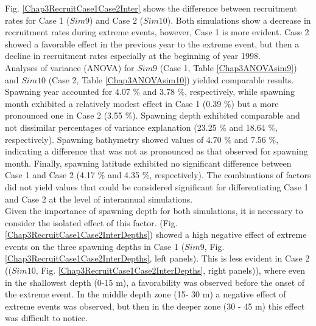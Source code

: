 Fig. \ref{Chap3RecruitCase1Case2Inter} shows the difference between recruitment rates for Case 1 ($Sim 9$) and Case 2 ($Sim 10$). Both simulations show a decrease in recruitment rates during extreme events, however, Case 1 is more evident. Case 2 showed a favorable effect in the previous year to the extreme event, but then a decline in recruitment rates especially at the beginning of year 1998.\\

Analyses of variance (ANOVA) for $Sim 9$ (Case 1, Table \ref{Chap3ANOVAsim9}) and $Sim 10$ (Case 2, Table \ref{Chap3ANOVAsim10}) yielded comparable results. Spawning year accounted for 4.07 \% and 3.78 \%, respectively, while spawning month exhibited a relatively modest effect in Case 1 (0.39 \%) but a more pronounced one in Case 2 (3.55 \%). Spawning depth exhibited comparable and not dissimilar percentages of variance explanation (23.25 \% and 18.64 \%, respectively). Spawning bathymetry showed values of 4.70 \% and 7.56 \%, indicating a difference that was not as pronounced as that observed for spawning month. Finally, spawning latitude exhibited no significant difference between Case 1 and Case 2 (4.17 \% and 4.35 \%, respectively). The combinations of factors did not yield values that could be considered significant for differentiating Case 1 and Case 2 at the level of interannual simulations.\\

Given the importance of spawning depth for both simulations, it is necessary to consider the isolated effect of this factor. (Fig. \ref{Chap3RecruitCase1Case2InterDepths}) showed a high negative effect of extreme events on the three spawning depths in Case 1 ($Sim 9$, Fig. \ref{Chap3RecruitCase1Case2InterDepths}, left panels). This is less evident in Case 2 (($Sim 10$, Fig. \ref{Chap3RecruitCase1Case2InterDepths}, right panels)), where even in the shallowest depth (0-15 m), a favorability was observed before the onset of the extreme event. In the middle depth zone (15- 30 m) a negative effect of extreme events was observed, but then in the deeper zone (30 - 45 m) this effect was difficult to notice.

